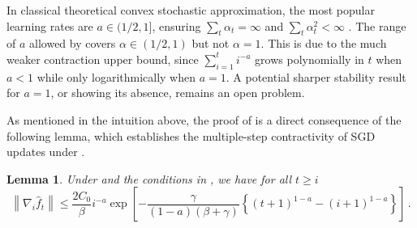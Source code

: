 \documentclass[11pt]{article}
\theoremstyle{plain}
\newtheorem{lemma}[theorem]{Lemma}
\begin{document}
In classical theoretical convex stochastic approximation, the most popular learning rates are $a\in(1/2,1]$, ensuring $\sum_t\alpha_t= \infty$ and $\sum_t \alpha_t^2<\infty$ \citep{nesterov2013introductory,bubeck2015convex}.  The range of $a$ allowed by  covers $\alpha\in(1/2,1)$ but not $\alpha=1$. This is due to the much weaker contraction upper bound, since $\sum_{i=1}^t i^{-a}$ grows polynomially in $t$ when $a<1$ while only logarithmically when $a=1$. A potential sharper stability result for $a=1$, or showing its absence, remains an open problem.


As mentioned in the intuition above, the proof of 
is a direct consequence of the following lemma, which establishes the multiple-step contractivity of SGD updates under .
\begin{lemma}\label{lem:6.1-first-order-error}
Under  and the conditions in , we have for all $t\ge i$
$$
\left\|\nabla_i\hat f_t\right\|\le\frac{2C_0}{\beta}i^{-a}\exp\left[-\frac{\gamma}{(1-a)(\beta+\gamma)}\left\{(t+1)^{1-a}-(i+1)^{1-a}\right\}\right]\,.
$$
\end{lemma}
\end{document}
